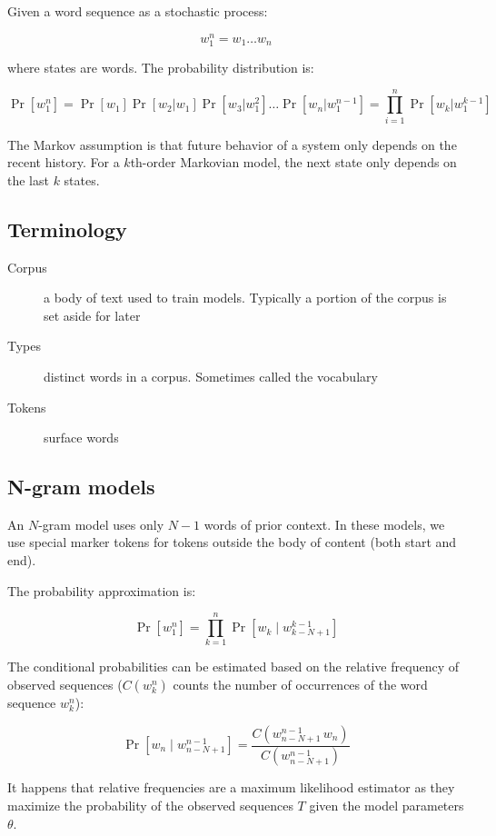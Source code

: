 \documentclass{idc_msc}
\begin{document}
Given a word sequence as a stochastic process:

\[w_1^n = w_1 \ldots w_n\]

where states are words.
The probability distribution is:

\[
  \Pr[w_1^n] = \Pr[w_1]\Pr[w_2|w_1]\Pr[w_3|w_1^2]\ldots\Pr[w_n|w_1^{n-1}] = \prod_{i=1}^n \Pr[w_k|w_1^{k-1}]
\]

The Markov assumption is that future behavior of a system only depends on the recent history.
For a \(k\)th-order Markovian model, the next state only depends on the last \(k\) states.

\subsection{Terminology}

\begin{description}
  \item[Corpus] a body of text used to train models. Typically a portion of the corpus is set aside for later 
  \item[Types] distinct words in a corpus. Sometimes called the vocabulary
  \item[Tokens] surface words
\end{description}

\subsection{N-gram models}

An \(N\)-gram model uses only \(N-1\) words of prior context.
In these models, we use special marker tokens for tokens outside the body of content (both start and end).

The probability approximation is:

\[
  \Pr\left[w_1^n\right] = \prod_{k=1}^n \Pr\left[w_k\mid w_{k-N+1}^{k-1}\right]
\]

The conditional probabilities can be estimated based on the relative frequency of observed sequences (\(C(w_k^n)\) counts the number of occurrences of the word sequence \(w_k^n\)):

\[
  \Pr\left[w_n\mid w_{n-N+1}^{n-1}\right] = \frac{C\left(w_{n-N+1}^{n-1}\,w_n\right)}{C\left(w_{n-N+1}^{n-1}\right)}
\]

It happens that relative frequencies are a maximum likelihood estimator as they maximize the probability of the observed sequences \(T\) given the model parameters \(\theta\).
\end{document}
